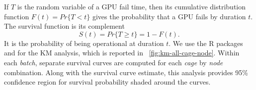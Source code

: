 If $T$ is the random variable of a GPU fail time, then its cumulative
distribution function $F(t) = Pr\{T < t\}$ gives the probability that
a GPU fails by duration $t$. The survival function is its complement
\begin{displaymath}
  S(t) = Pr\{T \geq t\} = 1 - F(t).
\end{displaymath}
It is the probability of being operational at duration $t$.  We use
the R packages  \cite{survival-package} and
 \cite{survminer-package} for the KM analysis, which is
reported in ~\ref{fig:km-all-cage-node}. Within each {\em
  batch}, separate survival curves are computed for each {\em cage} by
{\em node} combination. Along with the survival curve estimate, this
analysis provides 95\% confidence region for survival probability
shaded around the curves.
